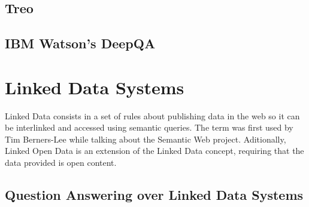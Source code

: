 \subsection{Treo}

\subsection{IBM Watson's DeepQA}

\section{Linked Data Systems}
\label{sec:linkd_sys}

Linked Data consists in a set of rules about publishing data in the web so it can be interlinked and accessed using semantic queries. The term was first used by Tim Berners-Lee while talking about the Semantic Web project. Aditionally, Linked Open Data is an extension of the Linked Data concept, requiring that the data provided is open content.


\subsection{Question Answering over Linked Data Systems}
\label{subsec:qa_linked}


